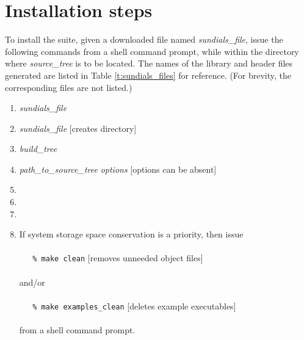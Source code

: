 \section{Installation steps}\label{ss:install_steps}

To install the {\sundials} suite, given a downloaded file named
{\em sundials\_file}, issue the following commands from
a shell command prompt, while within the directory where {\em source\_tree}
is to be located.  The names of the library and header files
generated are listed in Table \ref{t:sundials_files} for reference.
(For brevity, the corresponding  files are not listed.)
\begin{enumerate}
\item {} {\em sundials\_file}
\item {} {\em sundials\_file}\hspace{3em} [creates  directory]
\item {} {\em build\_tree}
\item {\em path\_to\_source\_tree} {\em options}\hspace{2em} [options can be absent]
\item {}
\item {}
\item {}
\item If system storage space conservation is a priority, then issue \\ \\
\verb+   % make clean+ \hspace{2em} [removes unneeded object files] \\ \\
and/or \\ \\
\verb+   % make examples_clean+ \hspace{2em} [deletes example executables] \\ \\
from a shell command prompt.
\end{enumerate}

